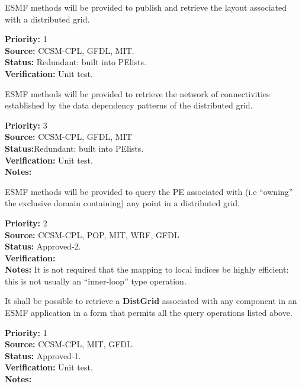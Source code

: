 
ESMF methods will be provided to publish and retrieve the layout
associated with a distributed grid.

\begin{reqlist}
{\bf Priority:} 1 \\
{\bf Source:} CCSM-CPL, GFDL, MIT. \\
{\bf Status:} Redundant: built into PElists. \\
{\bf Verification:} Unit test.
\end{reqlist}


ESMF methods will be provided to retrieve the network of
connectivities established by the data dependency patterns of the
distributed grid.

\begin{reqlist}
{\bf Priority:} 3 \\
{\bf Source:} CCSM-CPL, GFDL, MIT \\
{\bf Status:}Redundant: built into PElists.  \\
{\bf Verification:} Unit test.\\
{\bf Notes:}
\end{reqlist}


ESMF methods will be provided to query the PE associated with (i.e
``owning'' the exclusive domain containing) any point in a
distributed grid.

\begin{reqlist}
{\bf Priority:} 2 \\ 
{\bf Source:} CCSM-CPL, POP, MIT, WRF, GFDL \\
{\bf Status:} Approved-2. \\
{\bf Verification:} \\
{\bf Notes:} It is not required that the mapping to local indices be
highly efficient: this is not usually an ``inner-loop'' type operation.
\end{reqlist}


It shall be possible to retrieve a \textbf{DistGrid} associated with
any component in an ESMF application in a form that permits all the query
operations listed above.

\begin{reqlist}
{\bf Priority:} 1 \\
{\bf Source:} CCSM-CPL, MIT, GFDL. \\
{\bf Status:} Approved-1. \\
{\bf Verification:} Unit test. \\
{\bf Notes:}
\end{reqlist}

